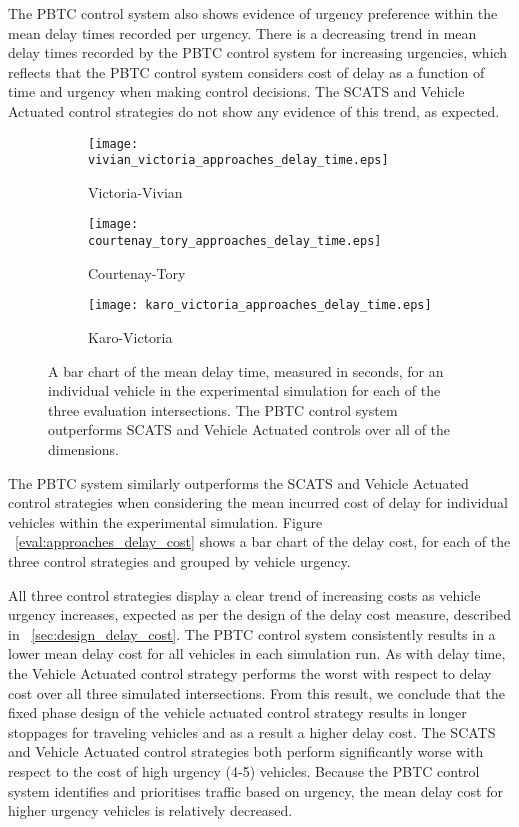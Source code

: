 The PBTC control system also shows evidence of urgency preference within the mean delay times recorded per urgency. There is a decreasing trend in mean delay times recorded by the PBTC control system for increasing urgencies, which reflects that the PBTC control system considers cost of delay as a function of time and urgency when making control decisions. The SCATS and Vehicle Actuated control strategies do not show any evidence of this trend, as expected.

\begin{figure}
\centering
\begin{subfigure}{.5\textwidth}
  \centering
  \texttt{[image: vivian\_victoria\_approaches\_delay\_time.eps]}
  \caption{Victoria-Vivian}
  \label{approaches_delay_time:sub1}
\end{subfigure}%
\begin{subfigure}{.5\textwidth}
  \centering
  \texttt{[image: courtenay\_tory\_approaches\_delay\_time.eps]}
  \caption{Courtenay-Tory}
  \label{approaches_delay_time:sub2}
\end{subfigure}

\vspace{1cm}

\begin{subfigure}{.5\textwidth}
  \centering
  \texttt{[image: karo\_victoria\_approaches\_delay\_time.eps]}
  \caption{Karo-Victoria}
  \label{approaches_delay_time:sub3}
\end{subfigure}%
\caption{ A bar chart of the mean delay time, measured in seconds, for an individual vehicle in the experimental simulation for each of the three evaluation intersections. The PBTC control system outperforms SCATS and Vehicle Actuated controls over all of the dimensions.  }
\label{eval:approaches_delay_time}
\end{figure}

The PBTC system similarly outperforms the SCATS and Vehicle Actuated control strategies when considering the mean incurred cost of delay for individual vehicles within the experimental simulation. Figure ~\ref{eval:approaches_delay_cost} shows a bar chart of the delay cost, for each of the three control strategies and grouped by vehicle urgency. 

All three control strategies display a clear trend of increasing costs as vehicle urgency increases, expected as per the design of the delay cost measure, described in ~\ref{sec:design_delay_cost}. The PBTC control system consistently results in a lower mean delay cost for all vehicles in each simulation run. As with delay time, the Vehicle Actuated control strategy performs the worst with respect to delay cost over all three simulated intersections. From this result, we conclude that the fixed phase design of the vehicle actuated control strategy results in longer stoppages for traveling vehicles and as a result a higher delay cost. The SCATS and Vehicle Actuated control strategies both perform significantly worse with respect to the cost of high urgency (4-5) vehicles. Because the PBTC control system identifies and prioritises traffic based on urgency, the mean delay cost for higher urgency vehicles is relatively decreased.

